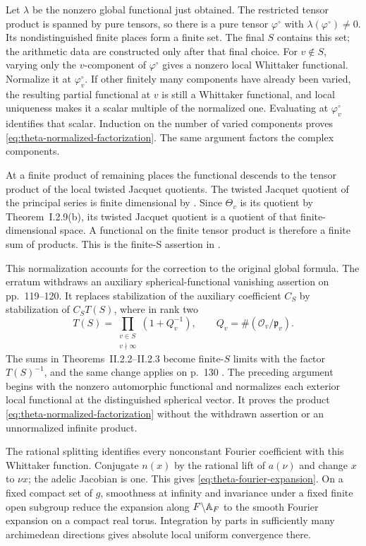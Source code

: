 Let \(\lambda\) be the nonzero global functional just obtained.  The
restricted tensor product is spanned by pure tensors, so there is a pure
tensor \(\varphi^\circ\) with \(\lambda(\varphi^\circ)\ne0\).  Its
nondistinguished finite places form a finite set.  The final \(S\) contains
this set; the arithmetic data are constructed only after that final choice.
For \(v\notin S\), varying only the \(v\)-component of \(\varphi^\circ\)
gives a nonzero local Whittaker functional.  Normalize it at
\(\varphi_v^\circ\).  If other finitely many components have already been
varied, the resulting partial functional at \(v\) is still a Whittaker
functional, and local uniqueness makes it a scalar multiple of the
normalized one.  Evaluating at \(\varphi_v^\circ\) identifies that scalar.
Induction on the number of varied components proves
\eqref{eq:theta-normalized-factorization}.  The same argument factors the
complex components.

At a finite product of remaining places the functional descends to the
tensor product of the local twisted Jacquet quotients.  The twisted Jacquet
quotient of the principal series is finite dimensional by
\cite[Lemma~I.3.2, p.~75]{KP84}.  Since \(\Theta_v\) is its quotient by
Theorem~I.2.9(b), its twisted Jacquet quotient is a quotient of that
finite-dimensional space.  A functional on the finite tensor product is
therefore a finite sum of products.  This is the finite-S assertion in
.

This normalization accounts for the correction to the original global
formula.  The erratum withdraws an auxiliary spherical-functional vanishing
assertion on pp.~119--120.  It replaces stabilization of the auxiliary
coefficient \(C_S\) by stabilization of \(C_ST(S)\), where in rank two
\[
 T(S)=\prod_{\substack{v\in S\\v\nmid\infty}}(1+Q_v^{-1}),
 \qquad Q_v=\#(\mathcal O_v/\mathfrak p_v).
\]
The sums in Theorems~II.2.2--II.2.3 become finite-\(S\) limits with the
factor \(T(S)^{-1}\), and the same change applies on p.~130
\cite[correction to Theorems~II.2.2--II.2.3]{KP85Erratum}.
The preceding argument begins with the nonzero automorphic functional and
normalizes each exterior local functional at the distinguished spherical
vector.  It proves the product \eqref{eq:theta-normalized-factorization}
without the withdrawn assertion or an unnormalized infinite product.

The rational splitting identifies every nonconstant Fourier coefficient
with this Whittaker function.  Conjugate \(n(x)\) by the rational lift of
\(a(\nu)\) and change \(x\) to \(\nu x\); the adelic Jacobian is one.
This gives \eqref{eq:theta-fourier-expansion}.  On a fixed compact set of
\(g\), smoothness at infinity and invariance under a fixed finite open
subgroup reduce the expansion along \(F\backslash\mathbb{A}_F\) to the smooth
Fourier expansion on a compact real torus.  Integration by parts in
sufficiently many archimedean directions gives absolute local uniform
convergence there.

